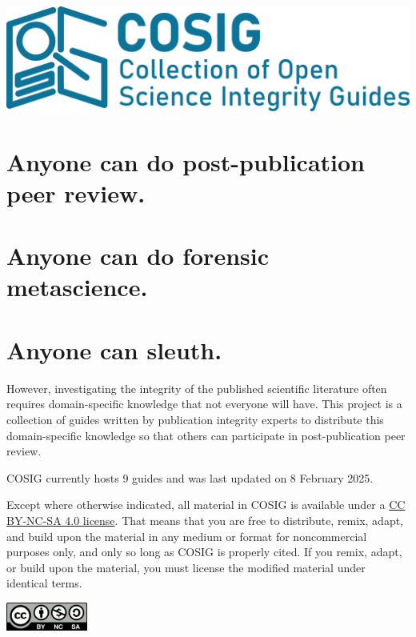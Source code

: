 \documentclass[letterpaper, 12pt]{article}
\begin{document}
\flushleft
\includegraphics[width=\textwidth]{img/home/241017_final_logo_mockup.png}

\section*{Anyone can do post-publication peer review.}
\section*{Anyone can do forensic metascience.}
\section*{Anyone can sleuth.}

However, investigating the integrity of the published scientific literature often requires domain-specific knowledge that not everyone will have. This project is a collection of guides written by publication integrity experts to distribute this domain-specific knowledge so that others can participate in post-publication peer review.

COSIG currently hosts 9 guides and was last updated on 8 February 2025.

Except where otherwise indicated, all material in COSIG is available under a \href{https://creativecommons.org/licenses/by-nc-sa/4.0/deed.en}{CC BY-NC-SA 4.0 license}. That means that you are free to distribute, remix, adapt, and build upon the material in any medium or format for noncommercial purposes only, and only so long as COSIG is properly cited. If you remix, adapt, or build upon the material, you must license the modified material under identical terms.

\includegraphics[width=0.2\textwidth]{img/home/Cc-by-nc-sa_icon.svg.png}
\end{document}

